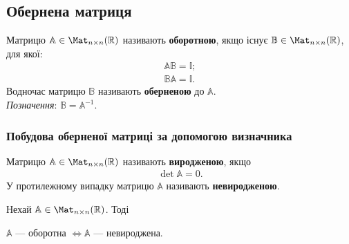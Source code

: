 \documentclass{math_library}
\begin{document}
\subsection{Обернена матриця}
\begin{definition}
Матрицю $\mathbb{A} \in \Mat_{n \times n}(\mathbb{R})$ називають \textbf{оборотною}, якщо існує $\mathbb{B} \in \Mat_{n \times n}(\mathbb{R})$, для якої:
\begin{align*}
\mathbb{A} \mathbb{B} = \mathbb{I}; \\
\mathbb{B} \mathbb{A} = \mathbb{I}.
\end{align*}
Водночас матрицю $\mathbb{B}$ називають \textbf{оберненою} до $\mathbb{A}$.\\
\textit{Позначення}: $\mathbb{B} = \mathbb{A}^{-1}$.
\end{definition}

\subsubsection*{Побудова оберненої матриці за допомогою визначника}
\begin{definition}
Матрицю $\mathbb{A} \in \Mat_{n \times n}(\mathbb{R})$ називають \textbf{виродженою}, якщо
\begin{align*}
\det \mathbb{A} = 0.
\end{align*}
У протилежному випадку матрицю $\mathbb{A}$ називають \textbf{невиродженою}.
\end{definition}

\begin{theorem}
Нехай $\mathbb{A} \in \Mat_{n \times n}(\mathbb{R})$. Тоді
\begin{center}
$\mathbb{A}$ --- оборотна $\iff \mathbb{A}$ --- невироджена.
\end{center}
\end{theorem}
\end{document}
